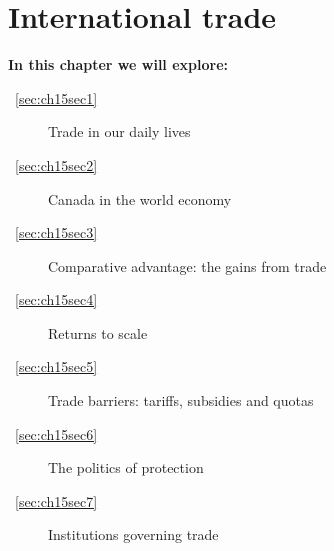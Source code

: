\chapter{International trade} \label{chap:internationaltrade}

\begin{topics}
\textbf{In this chapter we will explore:}
\begin{description}
\item [~\ref{sec:ch15sec1}] Trade in our daily lives
\item [~\ref{sec:ch15sec2}] Canada in the world economy
\item [~\ref{sec:ch15sec3}] Comparative advantage: the gains from trade
\item [~\ref{sec:ch15sec4}] Returns to scale
\item [~\ref{sec:ch15sec5}] Trade barriers: tariffs, subsidies and quotas
\item [~\ref{sec:ch15sec6}] The politics of protection
\item [~\ref{sec:ch15sec7}] Institutions governing trade
\end{description}
\end{topics}